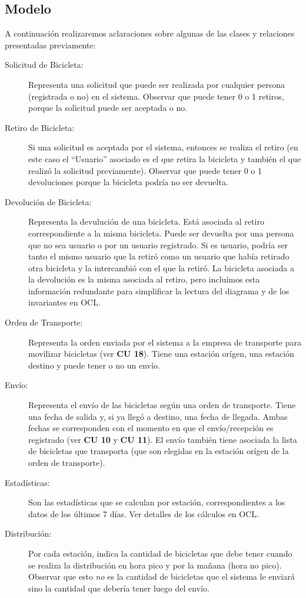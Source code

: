 \documentclass[a4paper, 10pt, twoside]{article}
\begin{document}
\subsection{Modelo}


A continuación realizaremos aclaraciones sobre algunas de las clases y relaciones presentadas previamente:
\begin{description}
 \item[Solicitud de Bicicleta:] Representa una solicitud que puede ser realizada por cualquier persona (registrada o no) en el sistema. Observar
 que puede tener 0 o 1 retiros, porque la solicitud puede ser aceptada o no.
 \item[Retiro de Bicicleta:] Si una solicitud es aceptada por el sistema, entonces se realiza el retiro (en este caso el ``Usuario''
 asociado es el que retira la bicicleta y también el que realizó la solicitud previamente). Observar que puede tener 0 o 1 devoluciones porque
 la bicicleta podría no ser devuelta.
 \item[Devolución de Bicicleta:] Representa la devulución de una bicicleta. Está asociada al retiro correspondiente a la misma bicicleta. Puede
 ser devuelta por una persona que no sea usuario o por un usuario registrado. Si es usuario, podría ser tanto el mismo usuario que la retiró como
 un usuario que había retirado otra bicicleta y la intercambió con el que la retiró. La bicicleta asociada a la devolución es la misma asociada
 al retiro, pero incluímos esta información redundante para simplificar la lectura del diagrama y de los invariantes en OCL.
 \item[Orden de Transporte:] Representa la orden enviada por el sistema a la empresa de transporte para movilizar bicicletas (ver {\bf CU 18}).
 Tiene una estación orígen, una estación destino y puede tener o no un envío.
 \item[Envío:] Representa el envío de las bicicletas según una orden de transporte. Tiene una fecha de salida y, si ya llegó a destino, una fecha de llegada. Ambas fechas se corresponden con el momento en que el envío/recepción es registrado (ver {\bf CU 10} y {\bf CU 11}). El envío también tiene
 asociada la lista de bicicletas que transporta (que son elegidas en la estación orígen de la orden de transporte).
 \item[Estadísticas:] Son las estadísticas que se calculan por estación, correspondientes a los datos de los últimos 7 días. Ver detalles de los cálculos en OCL.
 \item[Distribución:] Por cada estación, indica la cantidad de bicicletas que debe tener cuando se realiza la distribución en hora pico y por
 la mañana (hora no pico). Observar que esto \emph{no} es la cantidad de bicicletas que el sistema le enviará sino la cantidad que debería tener
 luego del envío.
\end{description}
\end{document}
